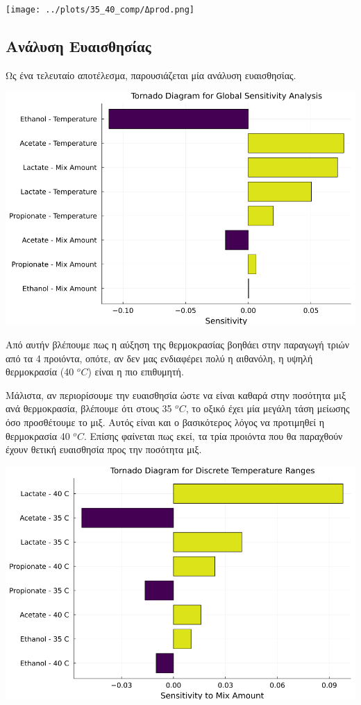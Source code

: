 \documentclass[11pt]{article}
\begin{document}
\begin{center}
\texttt{[image: ../plots/35\_40\_comp/Δprod.png]}
\end{center}

\subsection{Ανάλυση Ευαισθησίας}
\label{sec:org6c30cd9}
Ως ένα τελευταίο αποτέλεσμα, παρουσιάζεται μία ανάλυση ευαισθησίας.
\begin{center}
\includegraphics[width=.9\linewidth]{../plots/sensitivity/global_tornado.png}
\end{center}

Από αυτήν βλέπουμε πως η αύξηση της θερμοκρασίας βοηθάει στην παραγωγή τριών από τα 4 προιόντα, οπότε, αν δεν μας ενδιαφέρει πολύ η αιθανόλη, η υψηλή θερμοκρασία (40 \(^oC\)) είναι η πιο επιθυμητή.

Μάλιστα, αν περιορίσουμε την ευαισθησία ώστε να είναι καθαρά στην ποσότητα μιξ ανά θερμοκρασία, βλέπουμε ότι στους 35 \(^oC\), το οξικό έχει μία μεγάλη τάση μείωσης όσο προσθέτουμε το μιξ. Αυτός είναι και ο βασικότερος λόγος να προτιμηθεί η θερμοκρασία 40 \(^oC\). Επίσης φαίνεται πως εκεί, τα τρία προιόντα που θα παραχθούν έχουν θετική ευαισθησία προς την ποσότητα μιξ.

\begin{center}
\includegraphics[width=.9\linewidth]{../plots/sensitivity/temperature_tornado.png}
\end{center}
\end{document}
